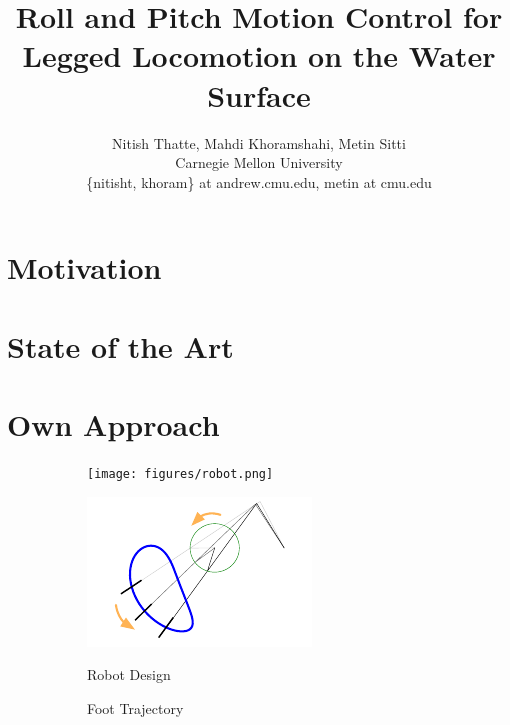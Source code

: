 \documentclass[letterpaper,twocolumn]{article}
\title{Roll and Pitch Motion Control for Legged Locomotion on the Water Surface}
\author{\small Nitish Thatte, Mahdi Khoramshahi, Metin Sitti \\
        \small Carnegie Mellon University \\
        \small \{nitisht, khoram\} at andrew.cmu.edu, metin at cmu.edu
}
\date{}
\begin{document}
\maketitle

\section{Motivation}


\section{State of the Art}


\section{Own Approach}


\begin{figure}[tb]
	\centering
	\begin{subfigure}[c]{0.24\textwidth}
		\centering
		\texttt{[image: figures/robot.png]}
	\end{subfigure}
	\begin{subfigure}[c]{0.24\textwidth}
		\centering
		\includegraphics[width = \textwidth]{figures/traj.pdf}
	\end{subfigure}

	\begin{subfigure}[c]{0.24\textwidth}
		\caption{Robot Design}
		\label{fig:robot}
	\end{subfigure}
	\begin{subfigure}[c]{0.24\textwidth}
		\caption{Foot Trajectory}
		\label{fig:traj}
	\end{subfigure}
	\caption{}
\end{figure}
\end{document}
